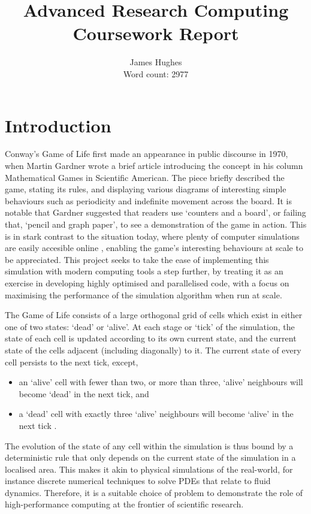 \documentclass[12pt]{article}
\title{Advanced Research Computing Coursework Report}
\author{James Hughes\\ Word count: 2977}
\begin{document}
\maketitle

\newpage

\tableofcontents

\newpage

\section{Introduction}

Conway's Game of Life first made an appearance in public discourse in 1970,
when Martin Gardner wrote a brief article introducing the concept in his column Mathematical Games in Scientific American\cite{gameoflife}.
The piece briefly described the game, stating its rules,
and displaying various diagrams of interesting simple behaviours such as periodicity and indefinite movement across the board.
It is notable that Gardner suggested that readers use `counters and a board', or failing that, `pencil and graph paper',
to see a demonstration of the game in action.
This is in stark contrast to the situation today, where plenty of computer simulations are easily accesible online \cite{playgameoflife},
enabling the game's interesting behaviours at scale to be appreciated.
This project seeks to take the ease of implementing this simulation with modern computing tools a step further,
by treating it as an exercise in developing highly optimised and parallelised code,
with a focus on maximising the performance of the simulation algorithm when run at scale.

The Game of Life consists of a large orthogonal grid of cells which exist in either one of two states: `dead' or `alive'.
At each stage or `tick' of the simulation, the state of each cell is updated according to its own current state,
and the current state of the cells adjacent (including diagonally) to it.
The current state of every cell persists to the next tick, except,

\begin{itemize}
    \item an `alive' cell with fewer than two, or more than three, `alive' neighbours will become `dead' in the next tick, and
    \item a `dead' cell with exactly three `alive' neighbours will become `alive' in the next tick \cite{gameoflife}.
\end{itemize}

The evolution of the state of any cell within the simulation is thus bound by a deterministic rule that only depends on the current state of the simulation in a localised area.
This makes it akin to physical simulations of the real-world, for instance discrete numerical techniques to solve PDEs that relate to fluid dynamics.
Therefore, it is a suitable choice of problem to demonstrate the role of high-performance computing at the frontier of scientific research.
\end{document}
